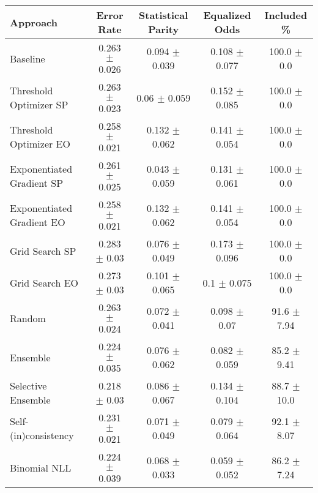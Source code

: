 \begin{tabular} {lcccc}
\toprule
\textbf{Approach} & \textbf{Error Rate} & \textbf{Statistical Parity} & \textbf{Equalized Odds} & \textbf{Included \%} \\ \midrule
Baseline & 0.263 $\pm$ 0.026 & 0.094 $\pm$ 0.039 & 0.108 $\pm$ 0.077 & \cellcolor{gold!30}100.0 $\pm$ 0.0 \\ 
Threshold Optimizer SP & 0.263 $\pm$ 0.023 & \cellcolor{silver!30}0.06 $\pm$ 0.059 & 0.152 $\pm$ 0.085 & \cellcolor{gold!30}100.0 $\pm$ 0.0 \\ 
Threshold Optimizer EO & 0.258 $\pm$ 0.021 & 0.132 $\pm$ 0.062 & 0.141 $\pm$ 0.054 & \cellcolor{gold!30}100.0 $\pm$ 0.0 \\ 
Exponentiated Gradient SP & 0.261 $\pm$ 0.025 & \cellcolor{gold!30}0.043 $\pm$ 0.059 & 0.131 $\pm$ 0.061 & \cellcolor{gold!30}100.0 $\pm$ 0.0 \\ 
Exponentiated Gradient EO & 0.258 $\pm$ 0.021 & 0.132 $\pm$ 0.062 & 0.141 $\pm$ 0.054 & \cellcolor{gold!30}100.0 $\pm$ 0.0 \\ 
Grid Search SP & 0.283 $\pm$ 0.03 & 0.076 $\pm$ 0.049 & 0.173 $\pm$ 0.096 & \cellcolor{gold!30}100.0 $\pm$ 0.0 \\ 
Grid Search EO & 0.273 $\pm$ 0.03 & 0.101 $\pm$ 0.065 & 0.1 $\pm$ 0.075 & \cellcolor{gold!30}100.0 $\pm$ 0.0 \\ 
Random & 0.263 $\pm$ 0.024 & 0.072 $\pm$ 0.041 & 0.098 $\pm$ 0.07 & 91.6 $\pm$ 7.94 \\ 
Ensemble & \cellcolor{silver!30}0.224 $\pm$ 0.035 & 0.076 $\pm$ 0.062 & \cellcolor{bronze!30}0.082 $\pm$ 0.059 & 85.2 $\pm$ 9.41 \\ 
Selective Ensemble & \cellcolor{gold!30}0.218 $\pm$ 0.03 & 0.086 $\pm$ 0.067 & 0.134 $\pm$ 0.104 & 88.7 $\pm$ 10.0 \\ 
Self-(in)consistency & 0.231 $\pm$ 0.021 & 0.071 $\pm$ 0.049 & \cellcolor{silver!30}0.079 $\pm$ 0.064 & 92.1 $\pm$ 8.07 \\ 
Binomial NLL & \cellcolor{silver!30}0.224 $\pm$ 0.039 & \cellcolor{bronze!30}0.068 $\pm$ 0.033 & \cellcolor{gold!30}0.059 $\pm$ 0.052 & 86.2 $\pm$ 7.24 \\ 
\bottomrule
\end{tabular}
